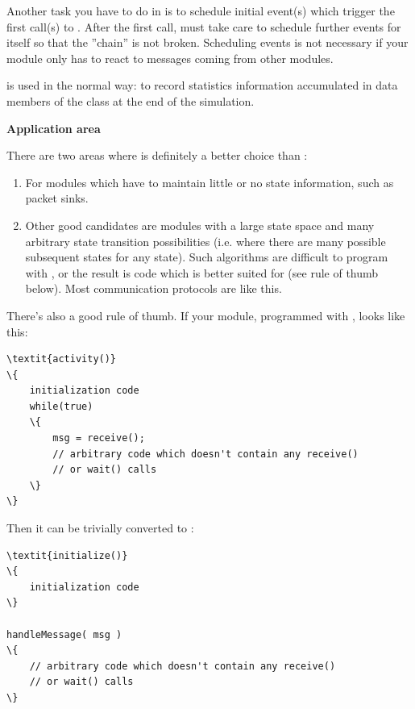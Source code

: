 Another task you have to do in  is to schedule
initial event(s) which trigger the first call(s)
to .  After the first call,
 must take care to schedule further events for
itself so that the ''chain'' is not broken. Scheduling events is not
necessary if your module only has to react to messages coming from
other modules.


 is used in the normal way: to record statistics information
accumulated in data members of the class at the end of the simulation.


\textbf{Application area}


There are two areas where  is definitely a better
choice than :
\begin{enumerate}
\item{For modules which have to maintain little or no state information,
    such as packet sinks.}
\item{Other good candidates are modules with a large state space and
    many arbitrary state transition possibilities (i.e. where there
    are many possible subsequent states for any state). Such algorithms
    are difficult to program with , or the result is code
    which is better suited for  (see rule of thumb
    below). Most communication protocols are like this.}
\end{enumerate}

There's also a good rule of thumb. If your module, programmed
with , looks like this:

\begin{Verbatim}[commandchars=\\\{\}]
\textit{activity()}
\{
    initialization code
    while(true)
    \{
        msg = receive();
        // arbitrary code which doesn't contain any receive()
        // or wait() calls
    \}
\}
\end{Verbatim}

Then it can be trivially converted to :

\begin{Verbatim}[commandchars=\\\{\}]
\textit{initialize()}
\{
    initialization code
\}

handleMessage( msg )
\{
    // arbitrary code which doesn't contain any receive()
    // or wait() calls
\}
\end{Verbatim}



